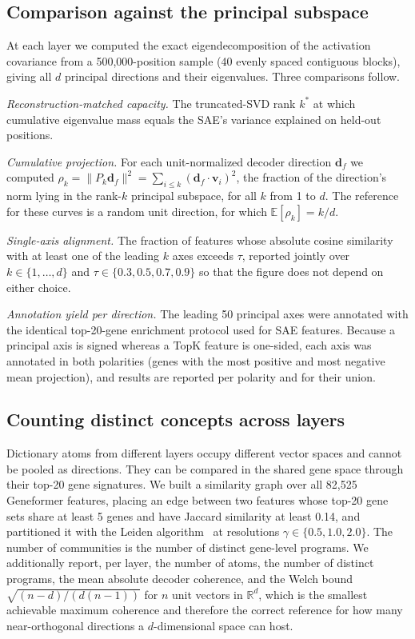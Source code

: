 \subsection*{Comparison against the principal subspace}

At each layer we computed the exact eigendecomposition of the activation covariance from a
500,000-position sample (40 evenly spaced contiguous blocks), giving all $d$ principal directions
and their eigenvalues. Three comparisons follow.

\emph{Reconstruction-matched capacity.} The truncated-SVD rank $k^{*}$ at which cumulative
eigenvalue mass equals the SAE's variance explained on held-out positions.

\emph{Cumulative projection.} For each unit-normalized decoder direction $\mathbf{d}_f$ we computed
$\rho_k = \lVert P_k \mathbf{d}_f \rVert^2 = \sum_{i \le k} (\mathbf{d}_f \cdot \mathbf{v}_i)^2$,
the fraction of the direction's norm lying in the rank-$k$ principal subspace, for all $k$ from 1
to $d$. The reference for these curves is a random unit direction, for which
$\mathbb{E}[\rho_k] = k/d$.

\emph{Single-axis alignment.} The fraction of features whose absolute cosine similarity with at
least one of the leading $k$ axes exceeds $\tau$, reported jointly over
$k \in \{1, \dots, d\}$ and $\tau \in \{0.3, 0.5, 0.7, 0.9\}$ so that the figure does not depend on
either choice.

\emph{Annotation yield per direction.} The leading 50 principal axes were annotated with the
identical top-20-gene enrichment protocol used for SAE features. Because a principal axis is signed
whereas a TopK feature is one-sided, each axis was annotated in both polarities (genes with the
most positive and most negative mean projection), and results are reported per polarity and for
their union.

\subsection*{Counting distinct concepts across layers}

Dictionary atoms from different layers occupy different vector spaces and cannot be pooled as
directions. They can be compared in the shared gene space through their top-20 gene signatures. We
built a similarity graph over all 82,525 Geneformer features, placing an edge between two features
whose top-20 gene sets share at least 5 genes and have Jaccard similarity at least 0.14, and
partitioned it with the Leiden algorithm~\cite{traag2019louvain} at resolutions
$\gamma \in \{0.5, 1.0, 2.0\}$. The number of communities is the number of distinct gene-level
programs. We additionally report, per layer, the number of atoms, the number of distinct programs,
the mean absolute decoder coherence, and the Welch bound
$\sqrt{(n-d)/(d(n-1))}$ for $n$ unit vectors in $\mathbb{R}^{d}$, which is the smallest achievable
maximum coherence and therefore the correct reference for how many near-orthogonal directions a
$d$-dimensional space can host.

